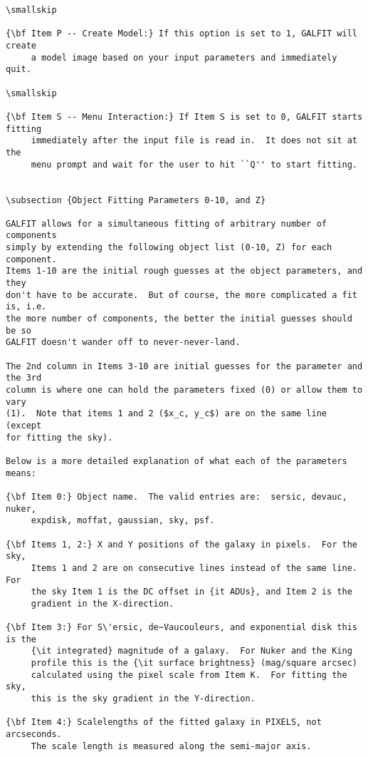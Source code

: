 \documentclass[preprint]{aastex}
\begin{document}
\begin {verbatim}
\smallskip

{\bf Item P -- Create Model:} If this option is set to 1, GALFIT will create
	 a model image based on your input parameters and immediately quit.

\smallskip

{\bf Item S -- Menu Interaction:} If Item S is set to 0, GALFIT starts fitting
	 immediately after the input file is read in.  It does not sit at the
	 menu prompt and wait for the user to hit ``Q'' to start fitting.


\subsection {Object Fitting Parameters 0-10, and Z}

GALFIT allows for a simultaneous fitting of arbitrary number of components
simply by extending the following object list (0-10, Z) for each component.
Items 1-10 are the initial rough guesses at the object parameters, and they
don't have to be accurate.  But of course, the more complicated a fit is, i.e.
the more number of components, the better the initial guesses should be so
GALFIT doesn't wander off to never-never-land.

The 2nd column in Items 3-10 are initial guesses for the parameter and the 3rd
column is where one can hold the parameters fixed (0) or allow them to vary
(1).  Note that items 1 and 2 ($x_c, y_c$) are on the same line (except
for fitting the sky).

Below is a more detailed explanation of what each of the parameters means:
 
{\bf Item 0:} Object name.  The valid entries are:  sersic, devauc, nuker,
	 expdisk, moffat, gaussian, sky, psf.

{\bf Items 1, 2:} X and Y positions of the galaxy in pixels.  For the sky,
	 Items 1 and 2 are on consecutive lines instead of the same line.  For
	 the sky Item 1 is the DC offset in {it ADUs}, and Item 2 is the
	 gradient in the X-direction.

{\bf Item 3:} For S\'ersic, de~Vaucouleurs, and exponential disk this is the
	 {\it integrated} magnitude of a galaxy.  For Nuker and the King
	 profile this is the {\it surface brightness} (mag/square arcsec)
	 calculated using the pixel scale from Item K.  For fitting the sky,
	 this is the sky gradient in the Y-direction.

{\bf Item 4:} Scalelengths of the fitted galaxy in PIXELS, not arcseconds.
	 The scale length is measured along the semi-major axis.


\end{verbatim}
\end{document}
